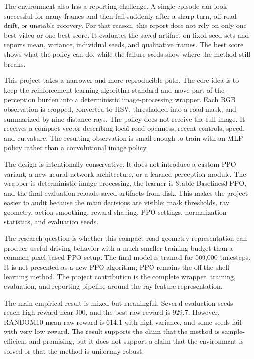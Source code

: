 \documentclass[conference]{IEEEtran}
\begin{document}
The environment also has a reporting challenge. A single episode can look successful for many frames and then fail suddenly after a sharp turn, off-road drift, or unstable recovery. For that reason, this report does not rely on only one best video or one best score. It evaluates the saved artifact on fixed seed sets and reports mean, variance, individual seeds, and qualitative frames. The best score shows what the policy can do, while the failure seeds show where the method still breaks.

This project takes a narrower and more reproducible path. The core idea is to keep the reinforcement-learning algorithm standard and move part of the perception burden into a deterministic image-processing wrapper. Each RGB observation is cropped, converted to HSV, thresholded into a road mask, and summarized by nine distance rays. The policy does not receive the full image. It receives a compact vector describing local road openness, recent controls, speed, and curvature. The resulting observation is small enough to train with an MLP policy rather than a convolutional image policy.

The design is intentionally conservative. It does not introduce a custom PPO variant, a new neural-network architecture, or a learned perception module. The wrapper is deterministic image processing, the learner is Stable-Baselines3 PPO, and the final evaluation reloads saved artifacts from disk. This makes the project easier to audit because the main decisions are visible: mask thresholds, ray geometry, action smoothing, reward shaping, PPO settings, normalization statistics, and evaluation seeds.

The research question is whether this compact road-geometry representation can produce useful driving behavior with a much smaller training budget than a common pixel-based PPO setup. The final model is trained for 500,000 timesteps. It is not presented as a new PPO algorithm; PPO remains the off-the-shelf learning method. The project contribution is the complete wrapper, training, evaluation, and reporting pipeline around the ray-feature representation.

The main empirical result is mixed but meaningful. Several evaluation seeds reach high reward near 900, and the best raw reward is 929.7. However, RANDOM10 mean raw reward is 614.1 with high variance, and some seeds fail with very low reward. The result supports the claim that the method is sample-efficient and promising, but it does not support a claim that the environment is solved or that the method is uniformly robust.
\end{document}
